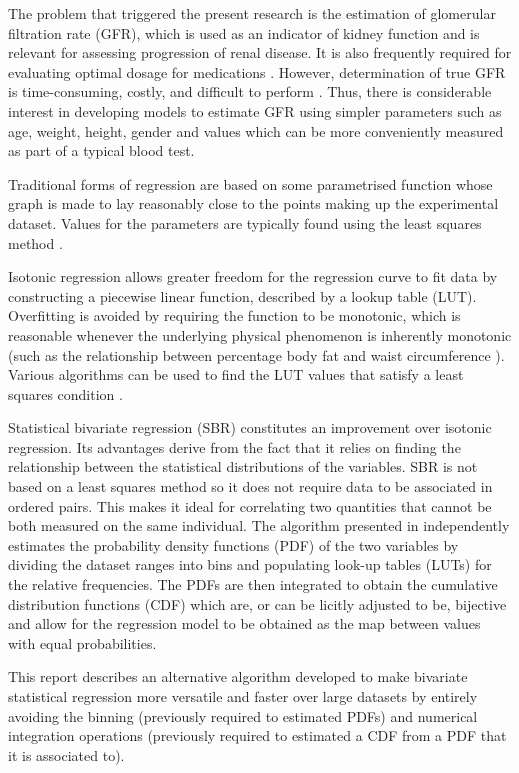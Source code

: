 \documentclass[10pt,final]{siamltex}
\begin{document}
The problem that triggered the present research is the estimation of glomerular filtration rate (GFR), which is used as an indicator of kidney function and is relevant for assessing progression of renal disease. It is also frequently required for evaluating optimal dosage for medications \cite{gfrmed,gfralb}. However, determination of true GFR is time-consuming, costly, and difficult to perform \cite{mgfr2,mgfr}. Thus, there is considerable interest in developing models to estimate GFR using simpler parameters such as age, weight, height, gender and values which can be more conveniently measured as part of a typical blood test.

Traditional forms of regression are based on some parametrised function whose graph is made to lay reasonably close to the points making up the experimental dataset. Values for the parameters are typically found using the least squares method \cite{book}.

Isotonic regression allows greater freedom for the regression curve to fit data by constructing a piecewise linear function, described by a lookup table (LUT). Overfitting is avoided by requiring the function to be monotonic, which is reasonable whenever the underlying physical phenomenon is inherently monotonic (such as the relationship between percentage body fat and waist circumference \cite{fat}). Various algorithms can be used to find the LUT values that satisfy a least squares condition \cite{bestchak, pava}.

Statistical bivariate regression (SBR) constitutes an improvement over isotonic regression. Its advantages derive from the fact that it relies on finding the relationship between the statistical distributions of the variables. SBR is not based on a least squares method so it does not require data to be associated in ordered pairs. This makes it ideal for correlating two quantities that cannot be both measured on the same individual. The algorithm presented in \cite{fiori} independently estimates the probability density functions (PDF) of the two variables by dividing the dataset ranges into bins and populating look-up tables (LUTs) for the relative frequencies. The PDFs are then integrated to obtain the cumulative distribution functions (CDF) which are, or can be licitly adjusted to be, bijective and allow for the regression model to be obtained as the map between values with equal probabilities.

This report describes an alternative algorithm developed to make bivariate statistical regression more versatile and faster over large datasets by entirely avoiding the binning (previously required to estimated PDFs) and numerical integration operations (previously required to estimated a CDF from a PDF that it is associated to).
\end{document}
